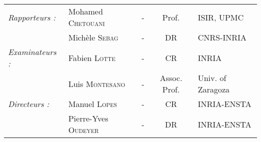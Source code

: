 \begin{titlepage}
\begin{center}
\noindent \large 
\begin{tabular}{llccl}
      \textit{Rapporteurs :}      & Mohamed \textsc{Chetouani}   & - & Prof.         & ISIR, UPMC          \\
                                & Mich\`ele \textsc{Sebag}     & - & DR            & CNRS-INRIA               \\
      \textit{Examinateurs :}    & Fabien \textsc{Lotte}        & - & CR            & INRIA                     \\
                                & Luis \textsc{Montesano}      & - & Assoc. Prof.  & Univ. of Zaragoza         \\
      \textit{Directeurs :}       & Manuel \textsc{Lopes}        & - & CR            & INRIA-ENSTA               \\
                                & Pierre-Yves \textsc{Oudeyer} & - & DR            & INRIA-ENSTA          \\
\end{tabular}
\end{center}
\end{titlepage}
\sloppy

\titlepage
